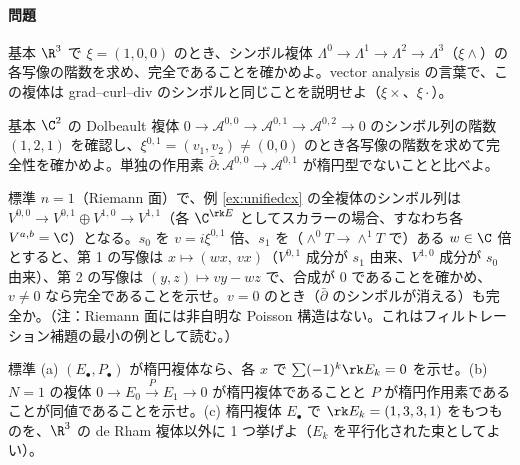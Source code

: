 \paragraph{問題}
\begin{prob}{基本}\label{p:koszul3}
$\R^3$ で $\xi=(1,0,0)$ のとき、シンボル複体 $\Lambda^0\to\Lambda^1\to\Lambda^2\to\Lambda^3$（$\xi\wedge$）の各写像の階数を求め、完全であることを確かめよ。vector analysis の言葉で、この複体は grad--curl--div のシンボルと同じことを説明せよ（$\xi\times$、$\xi\cdot$）。
\end{prob}
\begin{prob}{基本}\label{p:dbarcx2}
$\C^2$ の Dolbeault 複体 $0\to\mathcal A^{0,0}\to\mathcal A^{0,1}\to\mathcal A^{0,2}\to0$ のシンボル列の階数 $(1,2,1)$ を確認し、$\xi^{0,1}=(v_1,v_2)\ne(0,0)$ のとき各写像の階数を求めて完全性を確かめよ。単独の作用素 $\bar\partial:\mathcal A^{0,0}\to\mathcal A^{0,1}$ が楕円型でないことと比べよ。
\end{prob}
\begin{prob}{標準}\label{p:n1total}
$n=1$（Riemann 面）で、例 \ref{ex:unifiedcx} の全複体のシンボル列は $V^{0,0}\to V^{0,1}\oplus V^{1,0}\to V^{1,1}$（各 $\C^{\rk E}$ としてスカラーの場合、すなわち各 $V^{a,b}=\C$）となる。$s_0$ を $v=i\xi^{0,1}$ 倍、$s_1$ を（$\wedge^0T\to\wedge^1T$ で）ある $w\in\C$ 倍とすると、第 1 の写像は $x\mapsto(w x,\ v x)$（$V^{0,1}$ 成分が $s_1$ 由来、$V^{1,0}$ 成分が $s_0$ 由来）、第 2 の写像は $(y,z)\mapsto v y-w z$ で、合成が $0$ であることを確かめ、$v\neq0$ なら完全であることを示せ。$v=0$ のとき（$\bar\partial$ のシンボルが消える）も完全か。（注：Riemann 面には非自明な Poisson 構造はない。これはフィルトレーション補題の最小の例として読む。）
\end{prob}
\begin{prob}{標準}\label{p:cxcheck}
(a) $(E_\bullet,P_\bullet)$ が楕円複体なら、各 $x$ で $\sum(-1)^k\rk E_k=0$ を示せ。(b) $N=1$ の複体 $0\to E_0\xrightarrow{P}E_1\to0$ が楕円複体であることと $P$ が楕円作用素であることが同値であることを示せ。(c) 楕円複体 $E_\bullet$ で $\rk E_k=(1,3,3,1)$ をもつものを、$\R^3$ の de Rham 複体以外に 1 つ挙げよ（$E_k$ を平行化された束としてよい）。
\end{prob}
